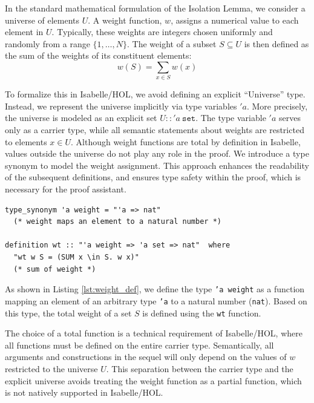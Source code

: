 In the standard mathematical formulation of the Isolation Lemma, we consider a universe of elements $U$.
A weight function, $w$, assigns a numerical value to each element in $U$. 
Typically, these weights are integers chosen uniformly and randomly from a range $\{1, \dots, N\}$.
The weight of a subset $S \subseteq U$ is then defined as the sum of the weights of its constituent elements:
\begin{equation}
    w(S) = \sum_{x \in S} w(x)
\end{equation}

To formalize this in Isabelle/HOL, we avoid defining an explicit ``Universe'' type.
Instead, we represent the universe implicitly via type variables $'a$.
More precisely, the universe is modeled as an explicit set $U :: 'a~\texttt{set}$.
The type variable $'a$ serves only as a carrier type, while all semantic statements about weights are restricted to elements $x \in U$.
Although weight functions are total by definition in Isabelle, values outside the universe do not play any role in the proof.
We introduce a type synonym to model the weight assignment.
This approach enhances the readability of the subsequent definitions, and ensures type safety within the proof, which is necessary for the proof assistant.

\listingneedspace
\begin{lstlisting}[language=Isabelle, caption={Definition of Weight Type and Weight Function}, label={lst:weight_def}]
type_synonym 'a weight = "'a => nat" 
  (* weight maps an element to a natural number *)

definition wt :: "'a weight => 'a set => nat"  where 
  "wt w S = (SUM x \in S. w x)"  
  (* sum of weight *)
\end{lstlisting}

As shown in Listing \ref{lst:weight_def}, we define the type \texttt{'a weight} as a function mapping an element of an arbitrary type \texttt{'a} to a natural number (\texttt{nat}).
Based on this type, the total weight of a set $S$ is defined using the \texttt{wt} function.
 
The choice of a total function is a technical requirement of Isabelle/HOL, where all functions must be defined on the entire carrier type.
Semantically, all arguments and constructions in the sequel will only depend on the values of $w$ restricted to the universe $U$.
This separation between the carrier type and the explicit universe avoids treating the weight function as a partial function, which is not natively supported in Isabelle/HOL.

